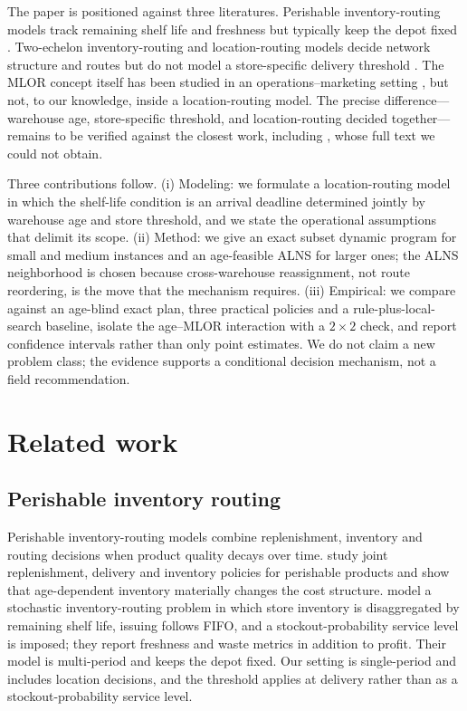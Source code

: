 \documentclass[preprint,12pt]{elsarticle}
\begin{document}
The paper is positioned against three literatures. Perishable inventory-routing models track remaining shelf life and freshness but typically keep the depot fixed \citep{coelho2014,crama2018}. Two-echelon inventory-routing and location-routing models decide network structure and routes but do not model a store-specific delivery threshold \citep{govindan2014,rohmer2019}. The MLOR concept itself has been studied in an operations--marketing setting \citep{singh2022}, but not, to our knowledge, inside a location-routing model. The precise difference---warehouse age, store-specific threshold, and location-routing decided together---remains to be verified against the closest work, including \citet{qiu2019}, whose full text we could not obtain.

Three contributions follow. (i) Modeling: we formulate a location-routing model in which the shelf-life condition is an arrival deadline determined jointly by warehouse age and store threshold, and we state the operational assumptions that delimit its scope. (ii) Method: we give an exact subset dynamic program for small and medium instances and an age-feasible ALNS for larger ones; the ALNS neighborhood is chosen because cross-warehouse reassignment, not route reordering, is the move that the mechanism requires. (iii) Empirical: we compare against an age-blind exact plan, three practical policies and a rule-plus-local-search baseline, isolate the age--MLOR interaction with a $2\times2$ check, and report confidence intervals rather than only point estimates. We do not claim a new problem class; the evidence supports a conditional decision mechanism, not a field recommendation.

\section{Related work}

\subsection{Perishable inventory routing}

Perishable inventory-routing models combine replenishment, inventory and routing decisions when product quality decays over time. \citet{coelho2014} study joint replenishment, delivery and inventory policies for perishable products and show that age-dependent inventory materially changes the cost structure. \citet{crama2018} model a stochastic inventory-routing problem in which store inventory is disaggregated by remaining shelf life, issuing follows FIFO, and a stockout-probability service level is imposed; they report freshness and waste metrics in addition to profit. Their model is multi-period and keeps the depot fixed. Our setting is single-period and includes location decisions, and the threshold applies at delivery rather than as a stockout-probability service level.
\end{document}
